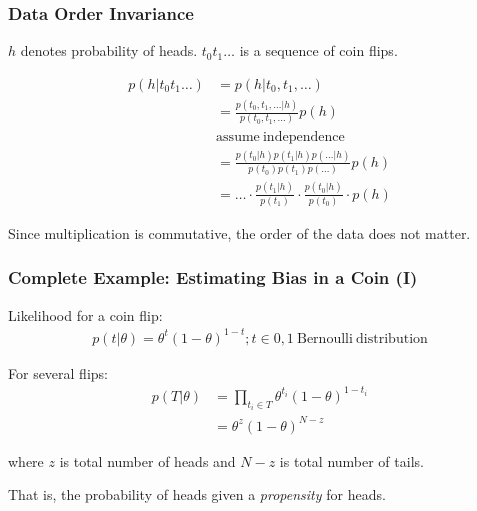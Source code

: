 \documentclass[usenames,dvipsnames,table]{beamer}
\begin{document}
\begin{frame}
\frametitle{Data Order Invariance}

$h$ denotes probability of heads.
$t_0t_1\ldots$ is a sequence of coin flips.

\begin{align*}
p(h|t_0t_1\ldots) &= p(h|t_0, t_1, \ldots)\\
                  &= \frac{p(t_0, t_1, \ldots|h)}{p(t_0, t_1, \ldots)}p(h) \\
                  &\mathrm{assume\ independence}\\
                  &= \frac{p(t_0|h) p(t_1|h) p(\ldots|h)}{p(t_0)p(t_1)p(\ldots)}p(h)\\
                  &= \ldots \cdot \frac{p(t_1|h)}{p(t_1)}
                            \cdot \frac{p(t_0|h)}{p(t_0)}
                            \cdot p(h)
\end{align*}

Since multiplication is commutative, the order of the data does not matter.

\end{frame}






\begin{frame}
\frametitle{Complete Example: Estimating Bias in a Coin (I)}

Likelihood for a coin flip:
\begin{align*}
p(t\vert \theta) = \theta^t(1-\theta)^{1-t}; t \in {0, 1}\ \mathrm{Bernoulli\ distribution}
\end{align*}

For several flips:
\begin{align*}
p(T\vert \theta)&= \prod_{t_i \in T} \theta^{t_i}(1-\theta)^{1-t_i} \\
                &= \theta^z(1-\theta)^{N-z}
\end{align*}

where $z$ is total number of heads and $N-z$ is total number of tails.

That is, the probability of heads given a \emph{propensity} for heads.

\end{frame}
\end{document}

